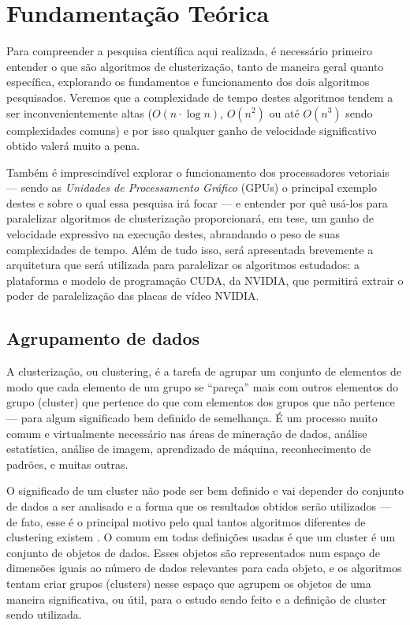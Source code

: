 \documentclass[12pt, %
openright, 
oneside, %
a4paper,    %
brazil]{facom-ufu-abntex2}
\def\qntAlgrtm{dois}
\begin{document}
\chapter{Fundamentação Teórica}

Para compreender a pesquisa científica aqui realizada, é necessário primeiro entender o que são algoritmos de clusterização, tanto de maneira geral quanto específica, explorando os fundamentos e funcionamento dos \qntAlgrtm{} algoritmos pesquisados. Veremos que a complexidade de tempo destes algoritmos tendem a ser inconvenientemente altas ($O(n\cdot\log{n})$, $O(n^2)$ ou até $O(n^3)$ sendo complexidades comuns) e por isso qualquer ganho de velocidade significativo obtido valerá muito a pena.

Também é imprescindível explorar o funcionamento dos processadores vetoriais --- sendo as \textit{Unidades de Processamento Gráfico} (GPUs) o principal exemplo destes e sobre o qual essa pesquisa irá focar --- e entender por quê usá-los para paralelizar algoritmos de clusterização proporcionará, em tese, um ganho de velocidade expressivo na execução destes, abrandando o peso de suas complexidades de tempo. Além de tudo isso, será apresentada brevemente a arquitetura que será utilizada para paralelizar os algoritmos estudados: a plataforma e modelo de programação CUDA, da NVIDIA, que permitirá extrair o poder de paralelização das placas de vídeo NVIDIA.




\section{Agrupamento de dados}

A clusterização, ou clustering, é a tarefa de agrupar um conjunto de elementos de modo que cada elemento de um grupo se \enquote{pareça} mais com outros elementos do grupo (cluster) que pertence do que com elementos dos grupos que não pertence --- para algum significado bem definido de semelhança. É um processo muito comum e virtualmente necessário nas áreas de mineração de dados, análise estatística, análise de imagem, aprendizado de máquina, reconhecimento de padrões, e muitas outras.

O significado de um cluster não pode ser bem definido e vai depender do conjunto de dados a ser analisado e a forma que os resultados obtidos serão utilizados --- de fato, esse é o principal motivo pelo qual tantos algoritmos diferentes de clustering existem \cite{SoManyClustAlg}. O comum em todas definições usadas é que um cluster é um conjunto de objetos de dados. Esses objetos são representados num espaço de dimensões iguais ao número de dados relevantes para cada objeto, e os algoritmos tentam criar grupos (clusters) nesse espaço que agrupem os objetos de uma maneira significativa, ou útil, para o estudo sendo feito e a definição de cluster sendo utilizada.
\end{document}
